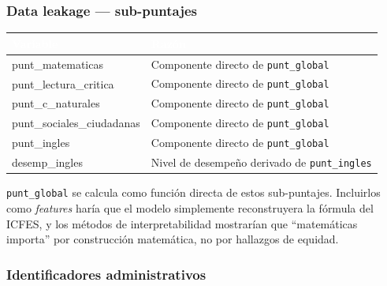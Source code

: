 \documentclass[12pt, a4paper]{article}
\newcommand{\thead}[1]{\cellcolor{tabheader}\textcolor{white}{\textbf{#1}}}
\begin{document}
\subsubsection{Data leakage — sub-puntajes}

\vspace{4pt}
\begin{tabularx}{\textwidth}{>{\ttfamily}l X}
  \toprule
  \thead{Variable} & \thead{Razón} \\
  \midrule
  \rowcolor{rowalt}
  punt\_matematicas          & Componente directo de \texttt{punt\_global} \\
  punt\_lectura\_critica     & Componente directo de \texttt{punt\_global} \\
  \rowcolor{rowalt}
  punt\_c\_naturales         & Componente directo de \texttt{punt\_global} \\
  punt\_sociales\_ciudadanas & Componente directo de \texttt{punt\_global} \\
  \rowcolor{rowalt}
  punt\_ingles               & Componente directo de \texttt{punt\_global} \\
  desemp\_ingles             & Nivel de desempeño derivado de \texttt{punt\_ingles} \\
  \bottomrule
\end{tabularx}
\vspace{6pt}

\texttt{punt\_global} se calcula como función directa de estos sub-puntajes.
Incluirlos como \textit{features} haría que el modelo simplemente reconstruyera
la fórmula del ICFES, y los métodos de interpretabilidad mostrarían que
``matemáticas importa'' por construcción matemática, no por hallazgos de equidad.

\subsubsection{Identificadores administrativos}
\end{document}
